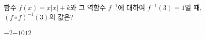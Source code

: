 함수 $f(x)=x|x|+k$와 그 역함수 $f^{-1}$에 대하여 $f^{-1}(3)=1$일 때, $(f\circ f)^{-1}(3)$의 값은? 
\begin{choices32}{$-2$}{$-1$}{$0$}{$1$}{$2$}\end{choices32}
